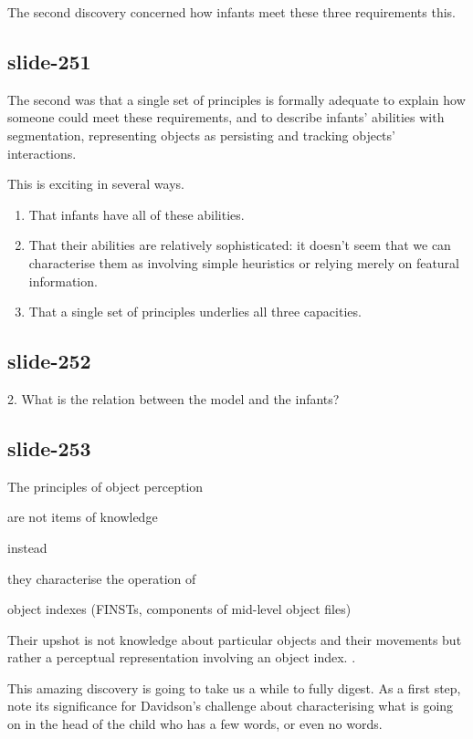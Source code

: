\documentclass[12pt,\papersize]{extarticle}
\begin{document}
The second discovery concerned how infants meet these three requirements this.

\subsection{slide-251}
The second was that a single set of principles is formally adequate to
explain how someone could meet these requirements, and to describe
infants' abilities with segmentation, representing objects as persisting
and tracking objects' interactions.

This is exciting in several ways.
\begin{enumerate}
\item That infants have all of these abilities.
\item That their abilities are relatively sophisticated: it doesn’t seem
that we can characterise them as involving simple heuristics or relying
merely on featural information.
\item That a single set of principles underlies all three capacities.
\end{enumerate}

\subsection{slide-252}
2. What is the relation between the model and the infants?

\subsection{slide-253}
The principles of object perception



are not items of knowledge



instead



they characterise the operation of



object indexes (FINSTs, components of mid-level object files)

Their upshot is not knowledge about particular objects and their movements but rather a
perceptual representation involving an object index.
\citep{Leslie:1998zk,Scholl:1999mi,Carey:2001ue,scholl:2007_objecta}.

This amazing discovery is going to take us a while to fully digest.  As a first step, note its
significance for Davidson's challenge about characterising what is going on in the head of the
child who has a few words, or even no words.
\end{document}
